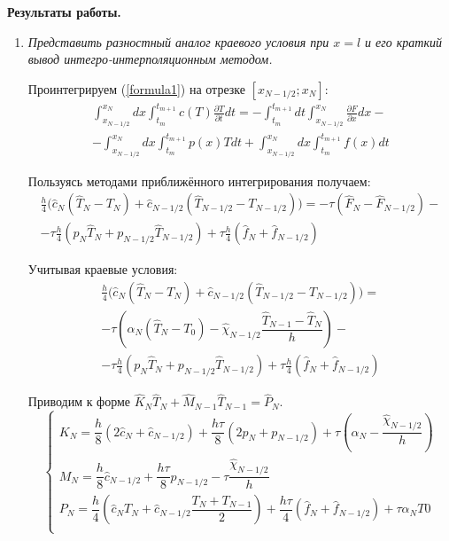 \textbf{Результаты работы.}
\begin{enumerate}
	\item \textit{Представить разностный аналог краевого условия при $x = l$
	и его краткий вывод интегро-интерполяционным методом.}  
	
	Проинтегрируем (\ref{formula1}) на отрезке $[x_{N-1/2}; x_{N}]$:
	\begin{align*}
		\int_{x_{N-1/2}}^{x_{N}} dx \int_{t_m}^{t_{m+1}} c(T) \frac{\partial T}{\partial t} dt 
		=	
		- \int_{t_m}^{t_{m+1}} dt \int_{x_{N-1/2}}^{x_{N}} \frac{\partial F}{\partial x} dx 	 
		- \\ -
		\int_{x_{N-1/2}}^{x_{N}} dx \int_{t_m}^{t_{m+1}} p(x)T dt 
		+
		\int_{x_{N-1/2}}^{x_{N}} dx \int_{t_m}^{t_{m+1}} f(x)dt
	\end{align*}
	
	Пользуясь методами приближённого интегрирования получаем:
	\begin{align*}
		\frac{h}{4}\big(\hat{c}_N (\hat{T}_N - T_N) + \hat{c}_{N-1/2} (\hat{T}_{N-1/2} - T_{N-1/2})\big)
		=
		- \tau(\hat{F}_{N} - \hat{F}_{N-1/2})
		- \\ -
		\tau \frac{h}{4}(p_{N}\hat{T}_{N} + p_{N-1/2}\hat{T}_{N-1/2})
		+
		\tau \frac{h}{4}(\hat{f}_{N} + \hat{f}_{N-1/2})
	\end{align*}
	
	Учитывая краевые условия:
	\begin{multline*}
		\frac{h}{4}\big(\hat{c}_N (\hat{T}_N - T_N) + \hat{c}_{N-1/2} (\hat{T}_{N-1/2} - T_{N-1/2})\big)
		= \\
		- \tau(\alpha_N(\hat{T}_N - T_0) - \hat{\chi}_{N-1/2} \dfrac{\hat{T}_{N-1} - \hat{T}_{N}}{h})
		- \\ -
		\tau \frac{h}{4} (p_{N}\hat{T}_{N} + p_{N-1/2}\hat{T}_{N-1/2})
		+
		\tau \frac{h}{4} (\hat{f}_{N} + \hat{f}_{N-1/2})
	\end{multline*}
	
	
	Приводим к форме $\hat{K}_N \hat{T}_{N} + \hat{M}_{N-1} \hat{T}_{N-1} = \hat{P}_N$.
	\begin{equation*}
		\begin{cases}
			K_N = \dfrac{h}{8}(2\hat{c}_N + \hat{c}_{N-1/2}) + \dfrac{h\tau}{8}(2p_N + p_{N-1/2}) + \tau(\alpha_N - \dfrac{\hat{\chi}_{N-1/2}}{h}) \\
			M_N = \dfrac{h}{8}\hat{c}_{N-1/2} + \dfrac{h\tau}{8}p_{N-1/2} - \tau\dfrac{\hat{\chi}_{N-1/2}}{h} \\ 
			P_N = \dfrac{h}{4}(\hat{c}_N T_N + \hat{c}_{N-1/2} \dfrac{T_N + T_{N-1}}{2}) + \dfrac{h \tau}{4} (\hat{f}_{N} + \hat{f}_{N-1/2}) +  \tau \alpha_N T0\\
		\end{cases}
	\end{equation*}
	


\end{enumerate}
